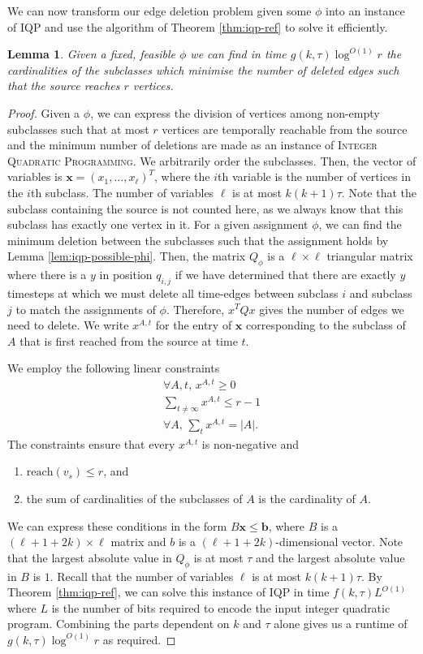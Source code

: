 \documentclass[preprint,12pt]{elsarticle}
\newtheorem{lemma}{Lemma}
\begin{document}
We can now transform our edge deletion problem given some $\phi$ into an instance of \textsc{IQP} and use the algorithm of Theorem \ref{thm:iqp-ref} to solve it efficiently.
\begin{lemma}\label{lem:iqp-cardinality-min}
    Given a fixed, feasible $\phi$ we can find in time $g(k,\tau)\log^{O(1)} r$ the cardinalities of the subclasses which minimise the number of deleted edges such that the source reaches $r$ vertices.
\end{lemma}
\begin{proof}
    Given a $\phi$, we can express the division of vertices among non-empty subclasses such that at most $r$ vertices are temporally reachable from the source and the minimum number of deletions are made as an instance of \textsc{Integer Quadratic Programming}. We arbitrarily order the subclasses. Then, the vector of variables is $\textbf{x}=(x_1,\ldots,x_{\ell})^T$, where the $i$th variable is the number of vertices in the $i$th subclass. The number of variables $\ell$ is at most $k(k+1)\tau$. Note that the subclass containing the source is not counted here, as we always know that this subclass has exactly one vertex in it. For a given assignment $\phi$, we can find the minimum deletion between the subclasses such that the assignment holds by Lemma \ref{lem:iqp-possible-phi}. Then, the matrix $Q_{\phi}$ is a $\ell\times \ell$ triangular matrix where there is a $y$ in position $q_{i,j}$ if we have determined that there are exactly $y$ timesteps at which we must delete all time-edges between subclass $i$ and subclass $j$ to match the assignments of $\phi$. Therefore, $x^TQx$ gives the number of edges we need to delete. We write $x^{A,t}$ for the entry of $\textbf{x}$ corresponding to the subclass of $A$ that is first reached from the source at time $t$.

    We employ the following linear constraints
    \begin{align}
        \nonumber \forall A,t,\,x^{A,t}\geq 0\\
        \sum_{t\neq \infty}x^{A,t}\leq r-1 \\
        \forall A,\, \sum_t x^{A,t}=|A|.
    \end{align}
The constraints ensure that every $x^{A,t}$ is non-negative and
\begin{enumerate}
    \item $\text{reach}(v_s)\leq r$, and
    \item the sum of cardinalities of the subclasses of $A$ is the cardinality of $A$.
\end{enumerate}
We can express these conditions in the form $B\textbf{x}\leq\textbf{b}$, where $B$ is a $(\ell+1+2k)\times \ell$ matrix and $b$ is a $(\ell +1+2k)$-dimensional vector.  Note that the largest absolute value in $Q_{\phi}$ is at most $\tau$ and the largest absolute value in $B$ is $1$. Recall that the number of variables $\ell$ is at most $k(k+1)\tau$. By Theorem \ref{thm:iqp-ref}, we can solve this instance of \textsc{IQP} in time $f(k,\tau)L^{O(1)}$ where $L$ is the number of bits required to encode the input integer quadratic program.
Combining the parts dependent on $k$ and $\tau$ alone gives us a runtime of $g(k,\tau)\log^{O(1)} r$ as required.
\end{proof}
\end{document}

